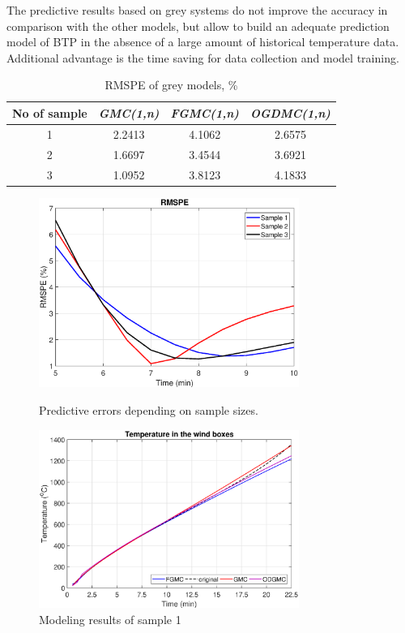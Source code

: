 \documentclass[AMS,STIX2COL]{WileyNJD-v2}
\begin{document}
The predictive results based on grey systems do not improve the accuracy in comparison with the other models, but allow to build an adequate prediction model of BTP in the absence of a large amount of historical temperature data. Additional advantage is the time saving for data collection and model training. 

\begin{center}
	\begin{table}[t]
		\centering
		\caption{RMSPE of grey models, \%} \label{tab:RMSPE1}
		\begin{tabular*}{500pt}{@{\extracolsep\fill}cccc@{\extracolsep\fill}}
			\toprule
			\textbf{No of sample} & \textbf{\textit{GMC(1,n)}}& \textbf{\textit{FGMC(1,n)}}& \textbf{\textit{OGDMC(1,n)}} \\
			\midrule
			1 & 2.2413 & 4.1062 & 2.6575 \\
			2 & 1.6697 & 3.4544 & 3.6921 \\
			3 & 1.0952 & 3.8123 & 4.1833 \\
			\bottomrule
		\end{tabular*}
	\end{table}
\end{center}
\begin{figure}
	\centering
	\parbox{8.5cm}{
		\includegraphics[width=8.5cm]{3.eps}
		\caption{Predictive errors depending on sample sizes.}
		\label{fig:RMSPE}}
	\qquad
	\begin{minipage}{8.5cm}
		\includegraphics[width=8.5cm]{4.eps}
		\caption{Modeling results of sample 1}
		\label{fig:GMsSample1}
	\end{minipage}
\end{figure}
	
\end{document}
